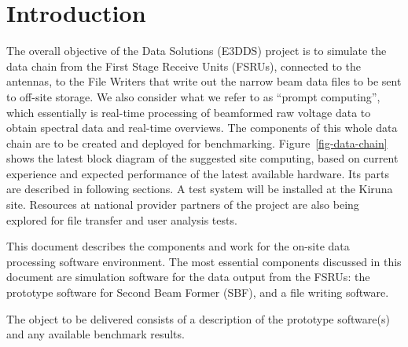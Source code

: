 \documentclass[12pt,a4paper]{article}
\begin{document}
\section{Introduction}
\label{intro}

The overall objective of the \ED Data Solutions (E3DDS) project is to simulate the data chain from the First Stage Receive Units (FSRUs), connected to the antennas, to the File Writers that write out the narrow beam data files to be sent to off-site storage. We also consider what we refer to as ``prompt computing'', which essentially is real-time processing of beamformed raw voltage data to obtain spectral data and real-time overviews.
The components of this whole data chain are to be created and deployed for benchmarking. 
Figure~\ref{fig-data-chain} shows the latest block diagram of the suggested \ED site computing, based on current experience and expected performance of the latest available hardware. 
Its parts are described in following sections. 
A test system will be installed at the Kiruna site. 
Resources at national \einfra provider partners of the project are also being explored for file transfer and user analysis tests.

This document describes the components and work for the on-site data processing software environment.
The most essential components discussed in this document are simulation software for the data output from the FSRUs: the prototype software for Second Beam Former (SBF), and a file writing software. 

The object to be delivered consists of a description of the prototype software(s) and any available benchmark results. 
\end{document}
